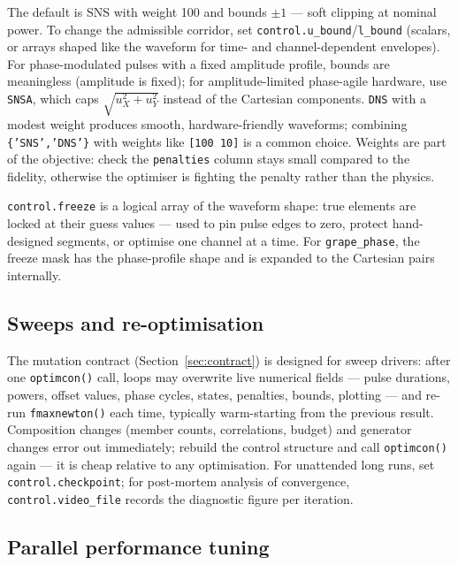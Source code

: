 \documentclass[11pt,a4paper]{article}
\newcommand{\code}[1]{\texttt{#1}}
\begin{document}
The default is SNS with weight 100 and bounds $\pm1$ --- soft clipping at
nominal power. To change the admissible corridor, set
\code{control.u\_bound}/\code{l\_bound} (scalars, or arrays shaped like
the waveform for time- and channel-dependent envelopes). For
phase-modulated pulses with a fixed amplitude profile, bounds are
meaningless (amplitude is fixed); for amplitude-limited phase-agile
hardware, use \code{SNSA}, which caps
$\sqrt{u_X^2+u_Y^2}$ instead of the Cartesian components. \code{DNS}
with a modest weight produces smooth, hardware-friendly waveforms;
combining \code{\{'SNS','DNS'\}} with weights like \code{[100 10]} is a
common choice. Weights are part of the objective: check the
\code{penalties} column stays small compared to the fidelity, otherwise
the optimiser is fighting the penalty rather than the physics.

\code{control.freeze} is a logical array of the waveform shape: true
elements are locked at their guess values --- used to pin pulse edges to
zero, protect hand-designed segments, or optimise one channel at a time.
For \code{grape\_phase}, the freeze mask has the phase-profile shape and
is expanded to the Cartesian pairs internally.

\subsection{Sweeps and re-optimisation}

The mutation contract (Section~\ref{sec:contract}) is designed for
sweep drivers: after one \code{optimcon()} call, loops may overwrite
live numerical fields --- pulse durations, powers, offset values, phase
cycles, states, penalties, bounds, plotting --- and re-run
\code{fmaxnewton()} each time, typically warm-starting from the previous
result. Composition changes (member counts, correlations, budget) and
generator changes error out immediately; rebuild the control structure
and call \code{optimcon()} again --- it is cheap relative to any
optimisation. For unattended long runs, set \code{control.checkpoint};
for post-mortem analysis of convergence, \code{control.video\_file}
records the diagnostic figure per iteration.

\subsection{Parallel performance tuning}
\end{document}
